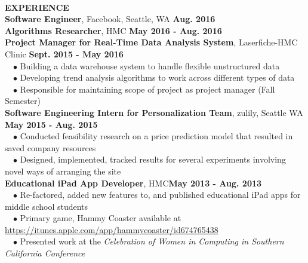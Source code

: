\documentclass[11.5pt]{article}
\newcommand{\wrapTitle}[1]{{\sectionNL \textbf{\Large #1}} \sectionNL}
\newcommand{\sectionNL}{~\\[1pt]}
\newcommand{\customtab}{$\hspace{10pt} \bullet \hspace{2pt}$}
\newcommand{\HMC}{HMC}
\newcommand{\rightAlign}{\hfill}
\begin{document}
\begin{flushleft}
\wrapTitle{EXPERIENCE}
\textbf{Software Engineer}, Facebook, Seattle, WA \rightAlign \textbf{Aug. 2016} \\
\textbf{Algorithms Researcher}, HMC \rightAlign \textbf{May 2016 - Aug. 2016} \\
\textbf{Project Manager for Real-Time Data Analysis System}, Laserfiche-HMC Clinic \rightAlign \textbf{Sept. 2015 - May 2016} \\ 
\customtab Building a data warehouse system to handle flexible unstructured data \\
\customtab Developing trend analysis algorithms to work across different types of data \\
\customtab Responsible for maintaining scope of project as project manager (Fall Semester)\\
\textbf{Software Engineering Intern for Personalization Team}, zulily, Seattle WA \rightAlign \textbf{May 2015 - Aug. 2015} \\
\customtab Conducted feasibility research on a price prediction model that resulted in saved company resources \\
\customtab Designed, implemented, tracked results for several experiments involving novel ways of arranging the site \\

\textbf{Educational iPad App Developer}, \HMC \rightAlign \textbf{May 2013 - Aug. 2013} \\
\customtab Re-factored, added new features to, and published educational iPad apps for middle school students \\
\customtab Primary game, Hammy Coaster available at \url{https://itunes.apple.com/app/hammycoaster/id674765438} \\
\customtab Presented work at the \textit{Celebration of Women in Computing in Southern California Conference }
\end{flushleft}


\end{document}
